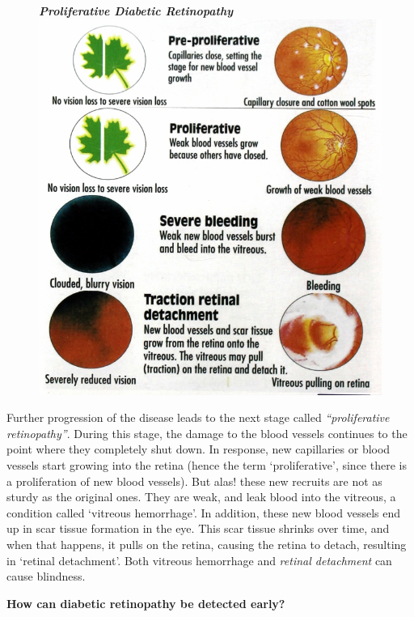 \begin{figure}
\centering
\textbf{\textit{Proliferative Diabetic Retinopathy}}\\
\includegraphics[scale=1.5]{images/055.jpg}
\end{figure}

Further progression of the disease leads to the next stage called \textit{“proliferative retinopa\-thy”}. During this stage, the damage to the blood vessels continues to the point where they completely shut down. In response, new capillaries or blood vessels start growing into the retina (hence the term ‘proliferative’, since there is a proliferation of new blood vessels). But alas! these new recruits are not as sturdy as the original ones. They are weak, and leak blood into the vitreous, a condition called ‘vitreous hemorrhage’. In addi\-tion, these new blood vessels end up in scar tissue formation in the eye. This scar tissue shrinks over time, and when that happens, it pulls on the retina, causing the retina to detach, resulting in ‘retinal deta\-chment’. Both vitreous hemorrhage and \textit{retinal detachment} can cause blindness.

\noindent\textbf{How can diabetic retinopathy be detected early?}

